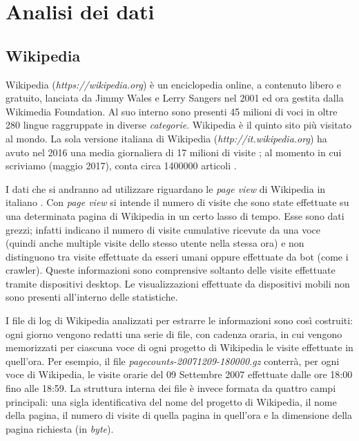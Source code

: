 \chapter{Analisi dei dati}
\bigskip

\section{Wikipedia}
\bigskip
Wikipedia (\textit{https://wikipedia.org}) è un enciclopedia online, a contenuto libero e gratuito, lanciata da Jimmy 
Wales e Lerry Sangers nel 2001 ed ora gestita dalla Wikimedia Foundation. Al suo interno sono presenti 45 milioni di voci in 
oltre 280 lingue raggruppate in diverse \textit{categorie}. Wikipedia è il quinto sito più visitato al mondo. La sola 
versione italiana di Wikipedia (\textit{http://it.wikipedia.org}) ha avuto nel 2016  una media giornaliera di 17 milioni di 
visite \cite{it_wikipedia_views_2016}; al momento in cui scriviamo (maggio 2017), conta circa 1400000 articoli 
\cite{wikipedia_stats}.
\bigskip

I dati che si andranno ad utilizzare riguardano le \textit{page view} di Wikipedia in italiano \cite{wikipedia_pageviews}. 
Con \textit{page view} si intende il numero di visite che sono state effettuate su una determinata pagina di Wikipedia in un 
certo lasso di tempo. Esse sono dati grezzi; infatti indicano il numero di visite cumulative ricevute da una voce (quindi 
anche multiple visite dello stesso utente nella stessa ora) e non distinguono tra visite effettuate da esseri umani oppure 
effettuate da bot (come i crawler). Queste informazioni sono comprensive soltanto delle visite effettuate tramite dispositivi 
desktop. Le visualizzazioni effettuate da dispositivi mobili non sono presenti all'interno delle statistiche.
\bigskip

I file di log di Wikipedia analizzati per estrarre le informazioni sono così costruiti: ogni giorno 
vengono redatti una serie di file, con cadenza oraria, in cui vengono memorizzati per ciascuna voce di ogni progetto di 
Wikipedia le visite effettuate in quell'ora. Per esempio, il file \textit{pagecounts-20071209-180000.gz} conterrà, per ogni 
voce di Wikipedia, le visite orarie del 09 Settembre 2007 effettuate dalle ore 18:00 fino alle 18:59. La struttura interna 
dei file è invece formata da quattro campi principali: una sigla identificativa del nome del progetto di Wikipedia, il nome 
della pagina, il numero di visite di quella pagina in quell'ora e la dimensione della pagina richiesta (in \textit{byte}).
\bigskip 
  
